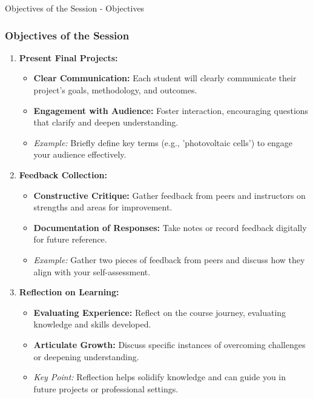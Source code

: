 \documentclass[aspectratio=169]{beamer}
\begin{document}
\begin{frame}[fragile]{Objectives of the Session - Objectives}
    \frametitle{Objectives of the Session}
    \begin{enumerate}
        \item \textbf{Present Final Projects:}
        \begin{itemize}
            \item \textbf{Clear Communication:} Each student will clearly communicate their project’s goals, methodology, and outcomes.
            \item \textbf{Engagement with Audience:} Foster interaction, encouraging questions that clarify and deepen understanding.
            \item \textit{Example:} Briefly define key terms (e.g., 'photovoltaic cells') to engage your audience effectively.
        \end{itemize}

        \item \textbf{Feedback Collection:}
        \begin{itemize}
            \item \textbf{Constructive Critique:} Gather feedback from peers and instructors on strengths and areas for improvement.
            \item \textbf{Documentation of Responses:} Take notes or record feedback digitally for future reference.
            \item \textit{Example:} Gather two pieces of feedback from peers and discuss how they align with your self-assessment.
        \end{itemize}

        \item \textbf{Reflection on Learning:}
        \begin{itemize}
            \item \textbf{Evaluating Experience:} Reflect on the course journey, evaluating knowledge and skills developed.
            \item \textbf{Articulate Growth:} Discuss specific instances of overcoming challenges or deepening understanding.
            \item \textit{Key Point:} Reflection helps solidify knowledge and can guide you in future projects or professional settings.
        \end{itemize}
    \end{enumerate}
\end{frame}
\end{document}
